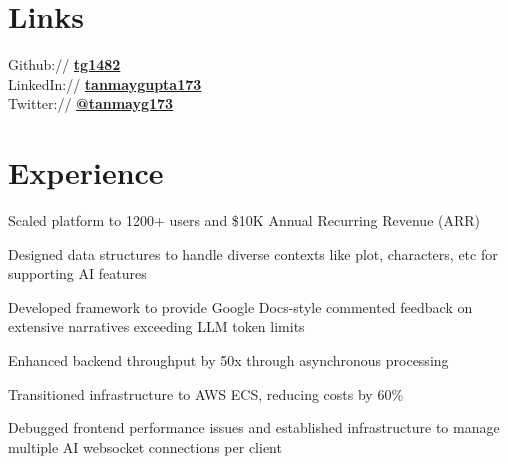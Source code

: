 \documentclass[]{deedy-resume-openfont}
\begin{document}
\begin{minipage}[t]{0.28\textwidth}
\section{Links} 
Github:// \href{https://github.com/tg1482}{\bf tg1482} \\
LinkedIn://  \href{https://www.linkedin.com/in/tanmaygupta173}{\bf tanmaygupta173} \\
Twitter:// \href{https://twitter.com/tanmayg173}{\bf @tanmayg173} \\


%
%

\end{minipage} 
\hfill
\begin{minipage}[t]{0.66\textwidth} 


\section{Experience}

\vspace{\topsep} %
\begin{tightemize}
\item Scaled platform to 1200+ users and \$10K Annual Recurring Revenue (ARR)
\item Designed data structures to handle diverse contexts like plot, characters, etc for supporting AI features
\item Developed framework to provide Google Docs-style commented feedback on extensive narratives exceeding LLM token limits
\item Enhanced backend throughput by 50x through asynchronous processing
\item Transitioned infrastructure to AWS ECS, reducing costs by 60\%
\item Debugged frontend performance issues and established infrastructure to manage multiple AI websocket connections per client
\end{tightemize}
\sectionsep


\end{minipage}
\end{document}

